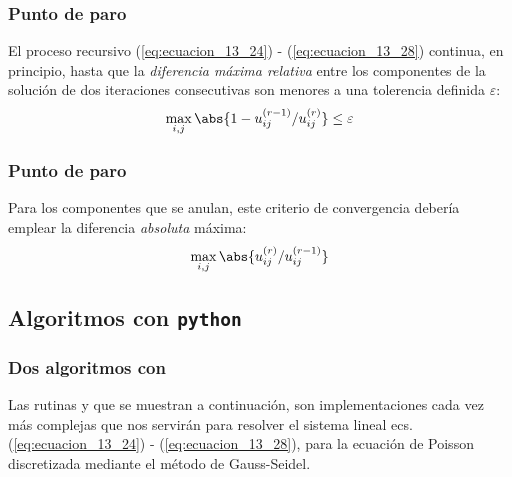 \begin{frame}
\frametitle{Punto de paro}
El proceso recursivo (\ref{eq:ecuacion_13_24}) - (\ref{eq:ecuacion_13_28}) continua, en principio, hasta que la \emph{diferencia máxima relativa} entre los componentes de la solución de dos iteraciones consecutivas son menores a una tolerencia definida $\varepsilon$:     
\begin{align}
\max_{i,j} \abs{1 - u_{ij}^{(r-1)} / u_{ij}^{(r)}} \leq \varepsilon
\label{eq:ecuacion_13_29}
\end{align}
\end{frame}
\begin{frame}
\frametitle{Punto de paro}
Para los componentes que se anulan, este criterio de convergencia debería emplear la diferencia \emph{absoluta} máxima:
\begin{align*}
\max_{i,j} \abs{u_{ij}^{(r)} / u_{ij}^{(r-1)}}
\end{align*}
\end{frame}
\subsection{Algoritmos con \texttt{python}}
\begin{frame}
\frametitle{Dos algoritmos con \python}
Las rutinas  y  que se muestran a continuación, son implementaciones cada vez más complejas que nos servirán para resolver el sistema lineal ecs. (\ref{eq:ecuacion_13_24}) - (\ref{eq:ecuacion_13_28}), para la ecuación de Poisson discretizada mediante el método de Gauss-Seidel.
\end{frame}
